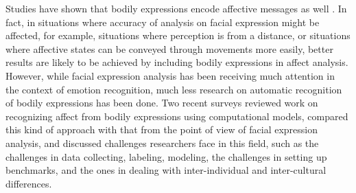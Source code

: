 Studies have shown that bodily expressions encode affective messages as well \cite{schroder2013culture, coulson2004attributing}. In fact, in situations where accuracy of analysis on facial expression might be affected, for example, situations where perception is from a distance, or situations where affective states can be conveyed through movements more easily, better results are likely to be achieved by including bodily expressions in affect analysis. However, while facial expression analysis has been receiving much attention in the context of emotion recognition, much less research on automatic recognition of bodily expressions has been done. Two recent surveys \cite{kleinsmith2013affective, karg2013body} reviewed work on recognizing affect from bodily expressions using computational models, compared this kind of approach with that from the point of view of facial expression analysis, and discussed challenges researchers face in this field, such as the challenges in data collecting, labeling, modeling, the challenges in setting up benchmarks, and the ones in dealing with inter-individual and inter-cultural differences.

